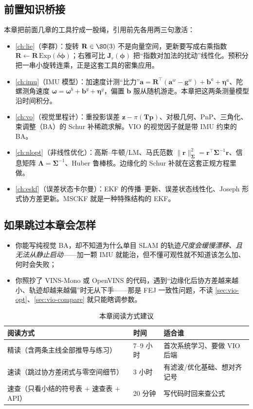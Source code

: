 \subsection*{前置知识桥接}
本章把前面几章的工具拧成一股绳，引用前先各用两三句激活：
\begin{itemize}
  \item \cref{ch:lie}（李群）：旋转 $\mathbf{R}\in\SO(3)$ 不是向量空间，更新要写成右乘指数 $\mathbf{R}\leftarrow\mathbf{R}\,\mathrm{Exp}(\delta\boldsymbol{\phi})$；右雅可比 $\mathbf{J}_r(\boldsymbol{\phi})$ 把“指数对加法的扰动”线性化。预积分把一串小旋转连乘，正是这套工具的密集应用。
  \item \cref{ch:imu}（IMU 模型）：加速度计测“比力”$\mathbf{a}=\mathbf{R}^\top(\mathbf{a}^w-\mathbf{g}^w)+\mathbf{b}^a+\boldsymbol{\eta}^a$、陀螺测角速度 $\boldsymbol{\omega}=\boldsymbol{\omega}^b+\mathbf{b}^g+\boldsymbol{\eta}^g$，偏置 $\mathbf{b}$ 服从随机游走。本章把这两条测量模型沿时间积分。
  \item \cref{ch:vo}（视觉里程计）：重投影误差 $\mathbf{z}-\pi(\mathbf{T}\mathbf{p})$、对极几何、PnP、三角化、束调整（BA）的 Schur 补稀疏求解。VIO 的视觉因子就是带 IMU 约束的 BA。
  \item \cref{ch:nlopt}（非线性优化）：高斯--牛顿/LM、马氏范数 $\|\mathbf{r}\|^2_{\boldsymbol{\Sigma}}=\mathbf{r}^\top\boldsymbol{\Sigma}^{-1}\mathbf{r}$、信息矩阵 $\boldsymbol{\Lambda}=\boldsymbol{\Sigma}^{-1}$、Huber 鲁棒核。边缘化的 Schur 补就在这套正规方程里做。
  \item \cref{ch:eskf}（误差状态卡尔曼）：EKF 的传播--更新、误差状态线性化、Joseph 形式协方差更新。MSCKF 就是一种特殊结构的 EKF。
\end{itemize}

\subsection*{如果跳过本章会怎样}
\begin{itemize}
  \item 你能写纯视觉 BA，却不知道为什么单目 SLAM 的轨迹\emph{尺度会缓慢漂移、且无法从静止启动}——加一颗 IMU 就能治，但不懂可观性就不知道该怎么加、何时会失败；
  \item 你照抄了 VINS-Mono 或 OpenVINS 的代码，遇到“边缘化后协方差越来越小、轨迹却越来越偏”时无从下手——那是 FEJ 一致性问题，不读 \cref{sec:vio-opt}、\cref{sec:vio-compare} 就只能瞎调参数。
\end{itemize}

\begin{table}[H]\centering\small
\caption{本章阅读方式建议}
\begin{tabular}{lll}
\toprule
阅读方式 & 时间 & 适合谁 \\
\midrule
精读（含两条主线全部推导与练习） & 7--9 小时 & 首次系统学习、要做 VIO 后端 \\
速读（跳过协方差闭式与零空间细节） & 3 小时 & 有滤波/优化基础、想对齐记号 \\
速查（只看小结的符号表 $+$ 速查表 $+$ API） & 20 分钟 & 写代码时回来查公式 \\
\bottomrule
\end{tabular}
\end{table}

